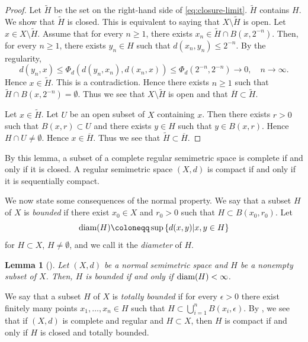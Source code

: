 \documentclass[a4paper, reqno, 11pt]{amsart}
\newtheorem{Lem}[Thm]{Lemma}
\theoremstyle{definition}
\begin{document}
\begin{proof}
Let $\widetilde{H}$ be the set on the right-hand side of \eqref{eq:closure-limit}. 
$\widetilde{H}$ contains $H$. 
We show that $\widetilde{H}$ is closed. 
This is equivalent to saying that $X \setminus \widetilde{H}$ is open. 
Let $x \in X \setminus \widetilde{H}$. 
Assume that for every $n \ge 1$, there exists $x_n \in \widetilde{H} \cap B(x, 2^{-n})$. 
Then, for every $n \ge 1$, there exists $y_n \in H$ such that $d(x_n, y_{n}) \le 2^{-n}$. 
By the regularity, 
\[ d(y_{n}, x) \le \Phi_d \left(d(y_{n}, x_n), d(x_n, x)\right) \le \Phi_d (2^{-n}, 2^{-n}) \to 0, \quad n \to \infty. \]
Hence $x \in \widetilde{H}$. 
This is a contradiction. 
Hence there exists $n \ge 1$ such that $ \widetilde{H} \cap B(x, 2^{-n}) = \emptyset$. 
Thus we see that $X \setminus \widetilde{H}$ is open and that $\overline{H} \subset \widetilde{H}$. 

Let $x \in \widetilde{H}$. 
Let $U$ be an open subset of $X$ containing $x$. 
Then there exists $r > 0$ such that $B(x,r) \subset U$ and there exists $y \in H$ such that $y \in B(x,r)$. 
Hence $H \cap U \ne \emptyset$. 
Hence $x \in \overline{H}$. 
Thus we see that $\widetilde{H} \subset \overline{H}$. 
\end{proof}

By this lemma, a subset of a complete regular semimetric space is complete if and only if it is closed. 
A regular semimetric space  $(X,d)$ is compact if and only if it is sequentially compact. 


We now state some consequences of the normal property. 
We say that a subset $H$ of $X$ is {\it bounded} if there exist $x_0 \in X$ and $r_0 > 0$ such that $H \subset B(x_0, r_0)$. 
Let 
\[ \textup{diam}(H) \coloneqq \sup\left\{d(x,y) | x, y \in H \right\} \] 
for $H \subset X$, $H \ne \emptyset$, and we call it the {\it diameter} of $H$. 

\begin{Lem}[{\cite[Proposition 3]{BessenyeiPenzes2022}}]\label{lem:bounded-basic}
Let $(X,d)$ be a normal semimetric space and $H$ be a nonempty subset of $X$. 
Then, $H$ is bounded if and only if $\textup{diam}(H) < \infty$. 
\end{Lem}

We say that a subset $H$ of $X$ is {\it totally bounded} if for every $\epsilon > 0$ there exist finitely many points $x_1, \dots, x_n \in H$ such that $H \subset \bigcup_{i=1}^{n} B(x_i, \epsilon)$. 
By \cite[Lemma 2]{BessenyeiPenzes2022}, 
we see that if $(X,d)$ is complete and regular and $H \subset X$, then $H$ is compact if and only if $H$ is closed and totally bounded. 
\end{document}
